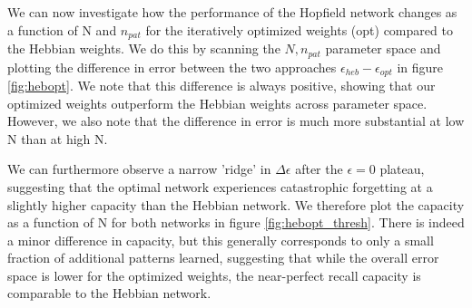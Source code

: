 \documentclass{article}
\begin{document}
We can now investigate how the performance of the Hopfield network changes as a function of N and $n_{pat}$ for the iteratively optimized weights (opt) compared to the Hebbian weights. We do this by scanning the $N, n_{pat}$ parameter space and plotting the difference in error between the two approaches $\epsilon_{heb}-\epsilon_{opt}$ in figure \ref{fig:hebopt}. We note that this difference is always positive, showing that our optimized weights outperform the Hebbian weights across parameter space. However, we also note that the difference in error is much more substantial at low N than at high N.

We can furthermore observe a narrow 'ridge' in $\Delta \epsilon$ after the $\epsilon=0$ plateau, suggesting that the optimal network experiences catastrophic forgetting at a slightly higher capacity than the Hebbian network. We therefore plot the capacity as a function of N for both networks in figure \ref{fig:hebopt_thresh}. There is indeed a minor difference in capacity, but this generally corresponds to only a small fraction of additional patterns learned, suggesting that while the overall error space is lower for the optimized weights, the near-perfect recall capacity is comparable to the Hebbian network.
\end{document}
